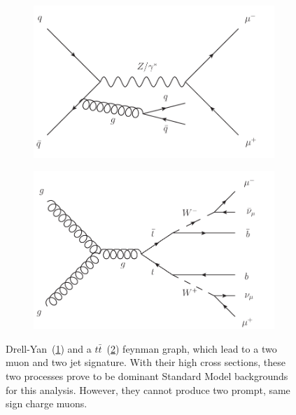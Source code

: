 \begin{figure}[htb!]
  \centering
  \begin{subfigure}[b]{0.495\textwidth}
    \centering
    \includegraphics[width=\textwidth]{plots/dyll.pdf}
    \caption{\label{fig:dyll}}
  \end{subfigure}
  \begin{subfigure}[b]{0.495\textwidth}
    \centering
    \includegraphics[width=\textwidth]{plots/ttbar.pdf}
    \caption{\label{fig:ttbar}}
  \end{subfigure}
  \caption{Drell-Yan~(\ref{fig:dyll}) and a $t\bar{t}$~(\ref{fig:ttbar}) feynman graph, which lead to a two muon and two jet signature. With their high cross sections, these two processes prove to be dominant Standard Model backgrounds for this analysis. However, they cannot produce two prompt, same sign charge muons.}
  \label{fig:dyllttbar}
\end{figure}

